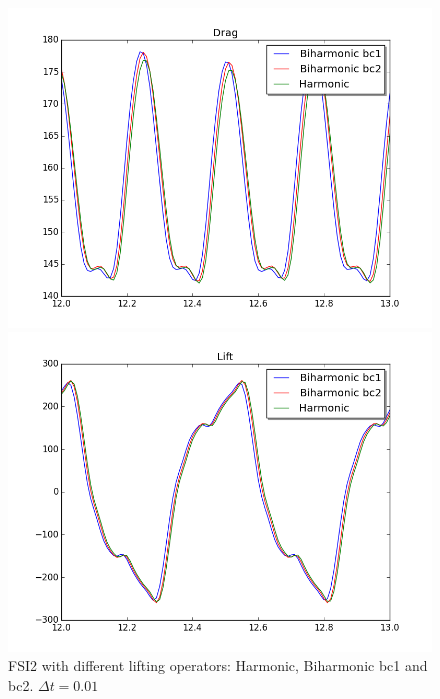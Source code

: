 \begin{figure}[H]
\begin{minipage}[b]{0.6\linewidth}
    \vspace{4ex}
  \end{minipage} 
  \begin{minipage}[b]{0.6\linewidth}
    \centering
    \includegraphics[scale=0.40]{./Mesh_motion_results/FSI2_dt001_drag.png} 
    \vspace{4ex}
  \end{minipage}%
  \begin{minipage}[b]{0.6\linewidth}
    \centering
    \includegraphics[scale=0.40]{./Mesh_motion_results/FSI2_dt001_lift.png} 
    \vspace{4ex}
  \end{minipage} 
\caption {FSI2 with different lifting operators: Harmonic, Biharmonic bc1 and bc2. $\Delta t = 0.01$}
\end{figure}

